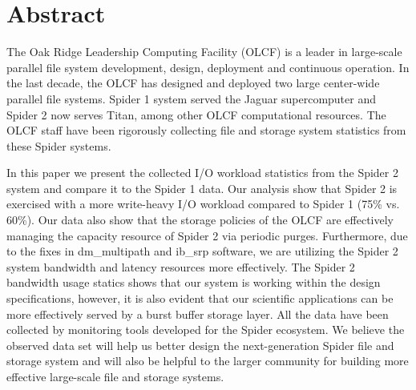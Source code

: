 \section*{Abstract}
\label{sec:abstract}

The Oak Ridge Leadership Computing Facility (OLCF) is a leader in large-scale
parallel file system development, design, deployment and continuous operation. In 
the last decade, the OLCF has designed and deployed two large center-wide parallel 
file systems. Spider 1 system served the Jaguar supercomputer and Spider 2 now serves Titan,
among other OLCF computational resources. The OLCF staff have been rigorously
collecting file and storage system statistics from these Spider systems. 

In this paper we present the collected I/O workload statistics from the Spider
2 system and compare it to the Spider 1 data. Our analysis show that Spider 2
is exercised with a more write-heavy I/O workload compared to Spider 1 (75\%
vs. 60\%). Our data also show that the storage policies of the OLCF are effectively managing the 
capacity resource of Spider 2 via periodic purges. Furthermore, due to the fixes in
dm\_multipath and ib\_srp software, we are utilizing the Spider 2 system
bandwidth and latency resources more effectively. The Spider 2 bandwidth usage statics shows that our
system is working within the design specifications, however, it is also evident
that our scientific applications can be more effectively served by a burst
buffer storage layer. All the data have been collected by monitoring tools developed 
for the Spider ecosystem. We believe the observed data set will help us
better design the next-generation Spider file and storage system and will also
be helpful to the larger community for building more effective large-scale file
and storage systems. 

 
